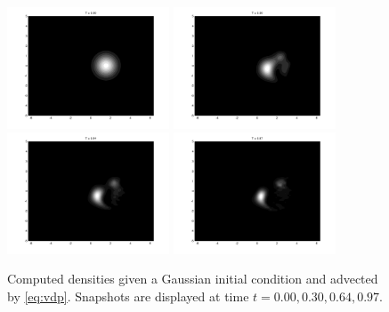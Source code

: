 \documentclass[letterpaper, 12 pt]{amsart}
\begin{document}
\begin{figure}[p]
  \centering
  \includegraphics[width=0.43\textwidth]{./images/vdp_t0p0.png}
  \includegraphics[width=0.43\textwidth]{./images/vdp_t0p30.png}
  \includegraphics[width=0.43\textwidth]{./images/vdp_t0p64.png}
  \includegraphics[width=0.43\textwidth]{./images/vdp_t0p97.png}
  \caption{Computed densities given a Gaussian initial condition
    and advected by \eqref{eq:vdp}.
    Snapshots are displayed at time $t=0.00,0.30,0.64,0.97$.
  }
  \label{fig:vdp_advection}
\end{figure}
\end{document}
